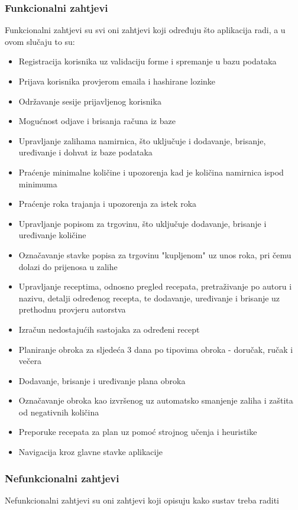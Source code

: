 \documentclass[diplomskirad]{fer}
\begin{document}
\subsubsection{Funkcionalni zahtjevi}
Funkcionalni zahtjevi su svi oni zahtjevi koji određuju što aplikacija radi, a u ovom slučaju to su:
\begin{itemize}
    \item Registracija korisnika uz validaciju forme i spremanje u bazu podataka
    \item Prijava korisnika provjerom emaila i hashirane lozinke
    \item Održavanje sesije prijavljenog korisnika
    \item Mogućnost odjave i brisanja računa iz baze
    \item Upravljanje zalihama namirnica, što uključuje i dodavanje, brisanje, uređivanje i dohvat iz baze podataka
    \item Praćenje minimalne količine i upozorenja kad je količina namirnica ispod minimuma
    \item Praćenje roka trajanja i upozorenja za istek roka
    \item Upravljanje popisom za trgovinu, što uključuje dodavanje, brisanje i uređivanje količine
    \item Označavanje stavke popisa za trgovinu "kupljenom" uz unos roka, pri čemu dolazi do prijenosa u zalihe
    \item Upravljanje receptima, odnosno pregled recepata, pretraživanje po autoru i nazivu, detalji određenog recepta, te dodavanje, uređivanje i brisanje uz prethodnu provjeru autorstva
    \item Izračun nedostajućih sastojaka za određeni recept
    \item Planiranje obroka za sljedeća 3 dana po tipovima obroka - doručak, ručak i večera
    \item Dodavanje, brisanje i uređivanje plana obroka
    \item Označavanje obroka kao izvršenog uz automatsko smanjenje zaliha i zaštita od negativnih količina
    \item Preporuke recepata za plan uz pomoć strojnog učenja i heuristike
    \item Navigacija kroz glavne stavke aplikacije
    
\end{itemize}

\subsubsection{Nefunkcionalni zahtjevi}
Nefunkcionalni zahtjevi su oni zahtjevi koji opisuju kako sustav treba raditi
\end{document}
